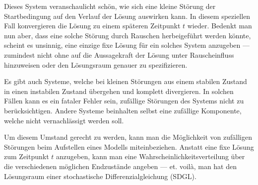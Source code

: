 Dieses System veranschaulicht schön, wie sich eine kleine Störung der Startbedingung auf den Verlauf der Lösung auswirken kann. In diesem speziellen Fall konvergieren die Lösung zu einem späteren Zeitpunkt $ t $ wieder. Bedenkt man nun aber, dass eine solche Störung durch Rauschen herbeigeführt werden könnte, scheint es unsinnig, eine einzige fixe Lösung für ein solches System anzugeben --- zumindest nicht ohne auf die Aussagekraft der Lösung unter Rauscheinfluss hinzuweisen oder den Lösungsraum genauer zu spezifizieren.

Es gibt auch Systeme, welche bei kleinen Störungen aus einem stabilen Zustand in einen instabilen Zustand übergehen und komplett divergieren. In solchen Fällen kann es ein fataler Fehler sein, zufällige Störungen des Systems nicht zu berücksichtigen. Andere Systeme beinhalten selbst eine zufällige Komponente, welche nicht vernachlässigt werden soll.

Um diesem Umstand gerecht zu werden, kann man die Möglichkeit von zufälligen Störungen beim Aufstellen eines Modells miteinbeziehen. Anstatt eine fixe Lösung zum Zeitpunkt $ t $ anzugeben, kann man eine Wahrscheinlichkeitsverteilung über die verschiedenen möglichen Endzustände angeben --- et. voilà, man hat den Lösungsraum einer stochastische Differenzialgleichung (SDGL).
